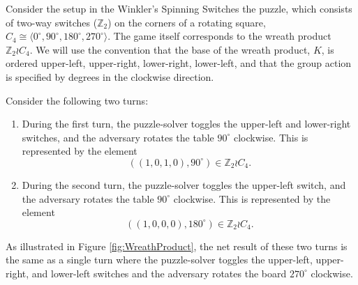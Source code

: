 \begin{example}
  Consider the setup in the Winkler's Spinning Switches the puzzle, which
  consists of two-way switches ($\mathbb Z_2$) on the corners of a rotating
  square,
  $C_4 \cong \langle 0^\circ, 90^\circ, 180^\circ, 270^\circ \rangle$.
  The game itself corresponds to the wreath product $\mathbb Z_2 \wr C_4$.
  We will use the convention that the base of the wreath product, $K$, is
  ordered upper-left, upper-right, lower-right, lower-left, and that the group
  action is specified by degrees in the clockwise direction.

  Consider the following two turns:
  \begin{enumerate}
    \item During the first turn,
    the puzzle-solver toggles the upper-left and lower-right switches, and
    the adversary rotates the table $90^\circ$ clockwise.
    This is represented by the element \begin{equation}
      ((1,0,1,0), 90^\circ) \in \mathbb Z_2 \wr C_4.
    \end{equation}
    \item During the second turn,
    the puzzle-solver toggles the upper-left switch, and
    the adversary rotates the table $90^\circ$ clockwise.
    This is represented by the element \begin{equation}
      ((1,0,0,0), 180^\circ) \in \mathbb Z_2 \wr C_4.
    \end{equation}
  \end{enumerate}
  As illustrated in Figure \ref{fig:WreathProduct},
  the net result of these two turns is the same as
  a single turn where the puzzle-solver toggles the
  upper-left, upper-right, and lower-left
  switches and the adversary rotates the board $270^\circ$ clockwise.

  \begin{figure}
    \center
\end{figure}
\end{example}
